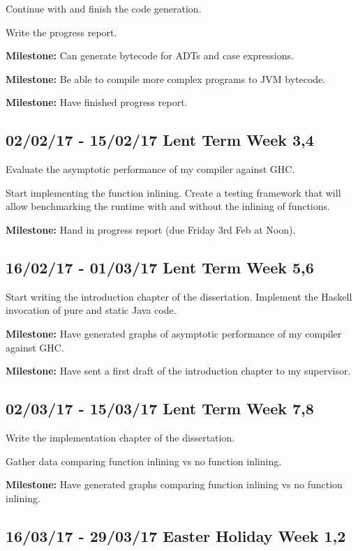 \documentclass[12pt,a4paper,twoside]{article}
\begin{document}
    Continue with and finish the code generation.

    Write the progress report.

    \textbf{Milestone:} Can generate bytecode for ADTs and case expressions.

    \textbf{Milestone:} Be able to compile more complex programs to JVM bytecode.

    \textbf{Milestone:} Have finished progress report.

    \subsection*{02/02/17 - 15/02/17 \hfill Lent Term Week 3,4}

      Evaluate the asymptotic performance of my compiler against GHC.

      Start implementing the function inlining. Create a testing framework that will allow benchmarking the runtime with and without the
      inlining of functions.


      \textbf{Milestone:} Hand in progress report (due Friday 3rd Feb at Noon).

    \subsection*{16/02/17 - 01/03/17 \hfill Lent Term Week 5,6}

      Start writing the introduction chapter of the dissertation. Implement the Haskell invocation of pure and static Java code.

      \textbf{Milestone:} Have generated graphs of asymptotic performance of my compiler against GHC.

      \textbf{Milestone:} Have sent a first draft of the introduction chapter to my supervisor.

    \subsection*{02/03/17 - 15/03/17 \hfill Lent Term Week 7,8}

      Write the implementation chapter of the dissertation.

      Gather data comparing function inlining vs no function inlining.

     \textbf{Milestone:} Have generated graphs comparing function inlining vs no function inlining.
      

    \subsection*{16/03/17 - 29/03/17 \hfill Easter Holiday Week 1,2}
\end{document}
